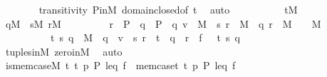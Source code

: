 \begin{isabellebody}
\ \ \ \ \ \ \isamarkupfalse%
\ transitivity\ P{\isacharunderscore}{\kern0pt}in{\isacharunderscore}{\kern0pt}M\ domain{\isacharunderscore}{\kern0pt}closed{\isacharbrackleft}{\kern0pt}of\ t{}{\isacharbrackright}{\kern0pt}\ \isamarkupfalse%
\ auto\isanewline
\ \ \ \ \isamarkupfalse%
\isanewline
\ \ \ \ \isamarkupfalse%
\ {\isacartoucheopen}t{}{\isasymin}M{\isacartoucheclose}\isanewline
\ \ \ \ \isamarkupfalse%
\isanewline
\ \ \ \ \isamarkupfalse%
\ {\isachardoublequoteopen}{\isasymexists}q{\isasymin}M\ {\isachardot}{\kern0pt}\ {\isasymexists}s{\isasymin}M{\isachardot}{\kern0pt}\ {\isasymexists}r{\isasymin}M{\isachardot}{\kern0pt}\isanewline
\ \ \ \ \ \ \ \ \ r\ {\isasymin}\ P\ {\isasymand}\ q\ {\isasymin}\ P\ {\isasymand}\ {\isasymlangle}q{\isacharcomma}{\kern0pt}\ v{\isasymrangle}\ {\isasymin}\ M\ {\isasymand}\ {\isasymlangle}s{\isacharcomma}{\kern0pt}\ r{\isasymrangle}\ {\isasymin}\ M\ {\isasymand}\ {\isasymlangle}q{\isacharcomma}{\kern0pt}\ r{\isasymrangle}\ {\isasymin}\ M\ {\isasymand}\ {}\ {\isasymin}\ M\ {\isasymand}\isanewline
\ \ \ \ \ \ \ \ \ {\isasymlangle}{}{\isacharcomma}{\kern0pt}\ t{}{\isacharcomma}{\kern0pt}\ s{\isacharcomma}{\kern0pt}\ q{\isasymrangle}\ {\isasymin}\ M\ {\isasymand}\ q\ {\isasympreceq}\ v\ {\isasymand}\ {\isasymlangle}s{\isacharcomma}{\kern0pt}\ r{\isasymrangle}\ {\isasymin}\ t{}\ {\isasymand}\ q\ {\isasympreceq}\ r\ {\isasymand}\ f\ {\isacharbackquote}{\kern0pt}\ {\isasymlangle}{}{\isacharcomma}{\kern0pt}\ t{}{\isacharcomma}{\kern0pt}\ s{\isacharcomma}{\kern0pt}\ q{\isasymrangle}\ {\isacharequal}{\kern0pt}\ {}{\isachardoublequoteclose}\isanewline
\ \ \ \ \ \ \isamarkupfalse%
\ tuples{\isacharunderscore}{\kern0pt}in{\isacharunderscore}{\kern0pt}M\ zero{\isacharunderscore}{\kern0pt}in{\isacharunderscore}{\kern0pt}M\ \isamarkupfalse%
\ auto\isanewline
\ \ \isacommand{{\isacharbraceright}{\kern0pt}}\isamarkupfalse%
\isanewline
\ \ \isamarkupfalse%
\isanewline
\ \ \isamarkupfalse%
\ {\isachardoublequoteopen}is{\isacharunderscore}{\kern0pt}mem{\isacharunderscore}{\kern0pt}case{\isacharparenleft}{\kern0pt}{\isacharhash}{\kern0pt}{\isacharhash}{\kern0pt}M{\isacharcomma}{\kern0pt}\ t{}{\isacharcomma}{\kern0pt}\ t{}{\isacharcomma}{\kern0pt}\ p{\isacharcomma}{\kern0pt}\ P{\isacharcomma}{\kern0pt}\ leq{\isacharcomma}{\kern0pt}\ f{\isacharparenright}{\kern0pt}{\isachardoublequoteclose}\ \ {\isachardoublequoteopen}mem{\isacharunderscore}{\kern0pt}case{\isacharparenleft}{\kern0pt}t{}{\isacharcomma}{\kern0pt}\ t{}{\isacharcomma}{\kern0pt}\ p{\isacharcomma}{\kern0pt}\ P{\isacharcomma}{\kern0pt}\ leq{\isacharcomma}{\kern0pt}\ f{\isacharparenright}{\kern0pt}{\isachardoublequoteclose}\isanewline

\end{isabellebody}
